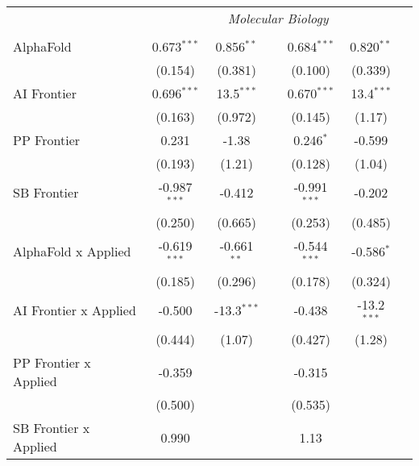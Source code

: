 \begin{tabular}{lcccccc}
 & \multicolumn{6}{c}{\textit{Molecular Biology}} \\ \\
   AlphaFold                      & 0.673$^{***}$  & 0.856$^{**}$  &               & 0.684$^{***}$  & 0.820$^{**}$  &   \\   
                                  & (0.154)        & (0.381)       &               & (0.100)        & (0.339)       &   \\   
   AI Frontier                    & 0.696$^{***}$  & 13.5$^{***}$  &               & 0.670$^{***}$  & 13.4$^{***}$  &   \\   
                                  & (0.163)        & (0.972)       &               & (0.145)        & (1.17)        &   \\   
   PP Frontier                    & 0.231          & -1.38         &               & 0.246$^{*}$    & -0.599        &   \\   
                                  & (0.193)        & (1.21)        &               & (0.128)        & (1.04)        &   \\   
   SB Frontier                    & -0.987$^{***}$ & -0.412        &               & -0.991$^{***}$ & -0.202        &   \\   
                                  & (0.250)        & (0.665)       &               & (0.253)        & (0.485)       &   \\   
   AlphaFold x Applied            & -0.619$^{***}$ & -0.661$^{**}$ &               & -0.544$^{***}$ & -0.586$^{*}$  &   \\   
                                  & (0.185)        & (0.296)       &               & (0.178)        & (0.324)       &   \\   
   AI Frontier x Applied          & -0.500         & -13.3$^{***}$ &               & -0.438         & -13.2$^{***}$ &   \\   
                                  & (0.444)        & (1.07)        &               & (0.427)        & (1.28)        &   \\   
   PP Frontier x Applied          & -0.359         &               &               & -0.315         &               &   \\   
                                  & (0.500)        &               &               & (0.535)        &               &   \\   
   SB Frontier x Applied          & 0.990          &               &               & 1.13           &               &   \\   

\end{tabular}
